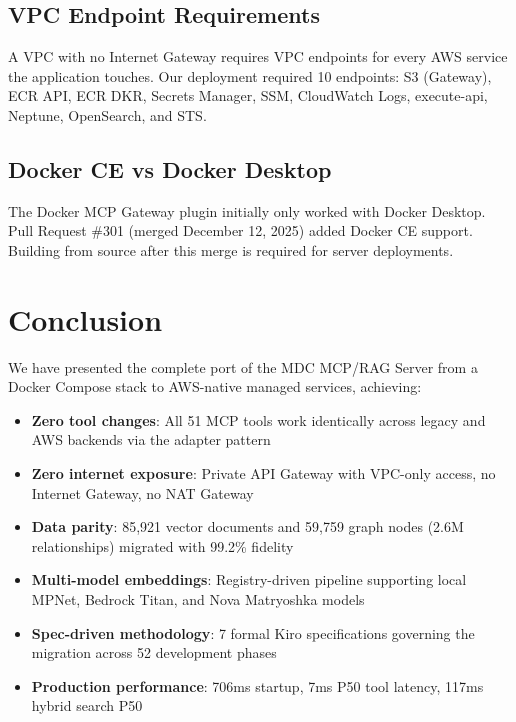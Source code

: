 \documentclass[11pt,letterpaper]{article}
\begin{document}
\subsection{VPC Endpoint Requirements}

A VPC with no Internet Gateway requires VPC endpoints for every AWS
service the application touches. Our deployment required 10 endpoints:
S3 (Gateway), ECR API, ECR DKR, Secrets Manager, SSM, CloudWatch Logs,
execute-api, Neptune, OpenSearch, and STS.

\subsection{Docker CE vs Docker Desktop}

The Docker MCP Gateway plugin initially only worked with Docker Desktop.
Pull Request \#301 (merged December 12, 2025) added Docker CE support.
Building from source after this merge is required for server deployments.

\section{Conclusion}

We have presented the complete port of the MDC MCP/RAG Server from a
Docker Compose stack to AWS-native managed services, achieving:

\begin{itemize}[noitemsep]
    \item \textbf{Zero tool changes}: All 51 MCP tools work identically
          across legacy and AWS backends via the adapter pattern
    \item \textbf{Zero internet exposure}: Private API Gateway with
          VPC-only access, no Internet Gateway, no NAT Gateway
    \item \textbf{Data parity}: 85,921 vector documents and 59,759 graph
          nodes (2.6M relationships) migrated with 99.2\% fidelity
    \item \textbf{Multi-model embeddings}: Registry-driven pipeline
          supporting local MPNet, Bedrock Titan, and Nova Matryoshka models
    \item \textbf{Spec-driven methodology}: 7 formal Kiro specifications
          governing the migration across 52 development phases
    \item \textbf{Production performance}: 706ms startup, 7ms P50 tool
          latency, 117ms hybrid search P50
\end{itemize}
\end{document}
